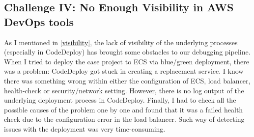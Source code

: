 \subsection{Challenge IV: No Enough Visibility in AWS DevOps tools}
As I mentioned in \ref{visibility}, the lack of visibility of the underlying processes (especially in CodeDeploy) has brought some obstacles to our debugging pipeline. When I tried to deploy the case project to ECS via blue/green deployment, there was a problem: CodeDeploy got stuck in creating a replacement service. I know there was something wrong within either the configuration of ECS, load balancer, health-check or security/network setting. However, there is no log output of the underlying deployment process in CodeDeploy. Finally, I had to check all the possible causes of the problem one by one and found that it was a failed health check due to the configuration error in the load balancer. Such way of detecting issues with the deployment was very time-consuming.
